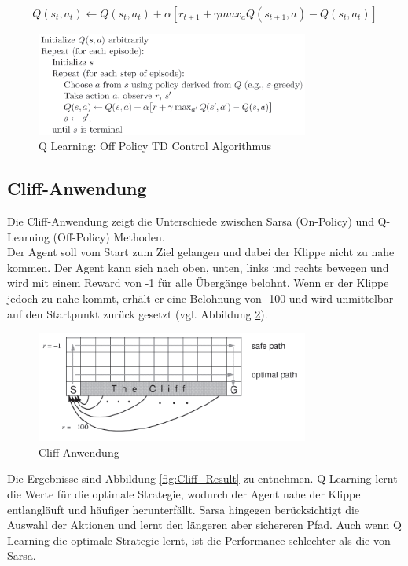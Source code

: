 \documentclass[10pt]{scrartcl}
\begin{document}
\begin{equation}
Q(s_{t},a_{t}) \leftarrow Q(s_{t},a_{t}) + \alpha [r_{t+1} + \gamma max_{a} Q(s_{t+1},a) - Q(s_{t},a_{t})]
\end{equation} 
 
\begin{figure}[htbp]
	\centering	\includegraphics[width=0.8\textwidth]{Bilder/Q-Learning.png}
	\caption{Q Learning: Off Policy TD Control Algorithmus}
	\label{fig:QLearning}
\end{figure}

\subsection{Cliff-Anwendung}
Die Cliff-Anwendung zeigt die Unterschiede zwischen Sarsa (On-Policy) und Q-Learning (Off-Policy) Methoden.\\
Der Agent soll vom Start zum Ziel gelangen und dabei der Klippe nicht zu nahe kommen. Der Agent kann sich nach oben, unten, links und rechts bewegen und wird mit einem Reward von -1 für alle Übergänge belohnt. Wenn er der Klippe jedoch zu nahe kommt, erhält er eine Belohnung von -100 und wird unmittelbar auf den Startpunkt zurück gesetzt (vgl. Abbildung \ref{fig:Cliff}).

\begin{figure}[htbp]
	\centering	\includegraphics[width=0.8\textwidth]{Bilder/Cliff.png}
	\caption{Cliff Anwendung}
	\label{fig:Cliff}
\end{figure}

Die Ergebnisse sind Abbildung \ref{fig:Cliff_Result} zu entnehmen. Q Learning lernt die Werte für die optimale Strategie, wodurch der Agent nahe der Klippe entlangläuft und häufiger herunterfällt. Sarsa hingegen berücksichtigt die Auswahl der Aktionen und lernt den längeren aber sichereren Pfad. Auch wenn Q Learning die optimale Strategie lernt, ist die Performance schlechter als die von Sarsa.\\
\end{document}
